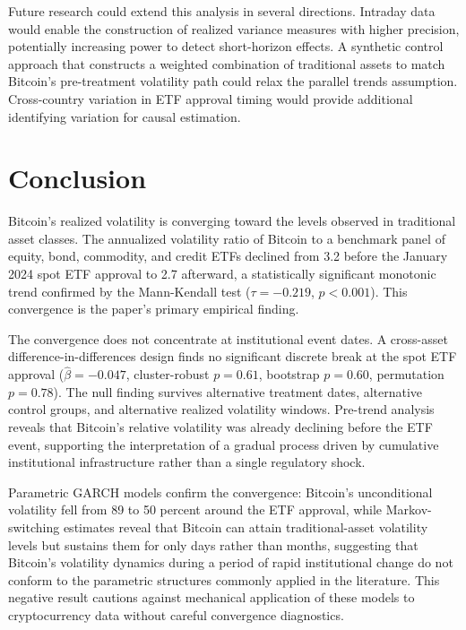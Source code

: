 \documentclass[12pt,a4paper]{article}
\begin{document}
Future research could extend this analysis in several directions. Intraday
data would enable the construction of realized variance measures with
higher precision, potentially increasing power to detect short-horizon
effects. A synthetic control approach \citep{abadie2010synthetic,
abadie2021using} that constructs a weighted combination of traditional
assets to match Bitcoin's pre-treatment volatility path could relax the
parallel trends assumption. Cross-country variation in ETF approval timing
would provide additional identifying variation for causal estimation.

\FloatBarrier

\section{Conclusion}\label{sec:conclusion}

Bitcoin's realized volatility is converging toward the levels observed in
traditional asset classes. The annualized volatility ratio of Bitcoin to a
benchmark panel of equity, bond, commodity, and credit ETFs declined from
3.2 before the January 2024 spot ETF approval to 2.7 afterward, a
statistically significant monotonic trend confirmed by the Mann-Kendall
test ($\tau = -0.219$, $p < 0.001$). This convergence is the paper's
primary empirical finding.

The convergence does not concentrate at institutional event dates. A
cross-asset difference-in-differences design finds no significant discrete
break at the spot ETF approval ($\hat{\beta} = -0.047$, cluster-robust $p
= 0.61$, bootstrap $p = 0.60$, permutation $p = 0.78$). The null finding
survives alternative treatment dates, alternative control groups, and
alternative realized volatility windows. Pre-trend analysis reveals that
Bitcoin's relative volatility was already declining before the ETF event,
supporting the interpretation of a gradual process driven by cumulative
institutional infrastructure rather than a single regulatory shock.

Parametric GARCH models confirm the convergence: Bitcoin's unconditional
volatility fell from 89 to 50 percent around the ETF approval, while
Markov-switching estimates reveal that Bitcoin can attain traditional-asset
volatility levels but sustains them for only days rather than months,
suggesting
that Bitcoin's volatility dynamics during a period of rapid institutional
change do not conform to the parametric structures commonly applied in the
literature. This negative result cautions against mechanical application of
these models to cryptocurrency data without careful convergence diagnostics.
\end{document}
